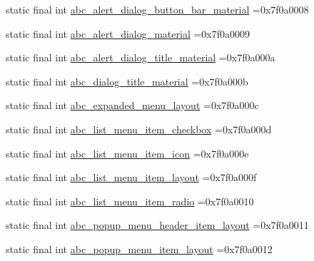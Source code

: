 \begin{DoxyCompactItemize}
\item 
static final int \mbox{\hyperlink{classcom_1_1example_1_1trainawearapplication_1_1_r_1_1layout_ae1856279bb4482399f68fefca5378a42}{abc\+\_\+alert\+\_\+dialog\+\_\+button\+\_\+bar\+\_\+material}} =0x7f0a0008
\item 
static final int \mbox{\hyperlink{classcom_1_1example_1_1trainawearapplication_1_1_r_1_1layout_a47723015bde9572767438130715175b2}{abc\+\_\+alert\+\_\+dialog\+\_\+material}} =0x7f0a0009
\item 
static final int \mbox{\hyperlink{classcom_1_1example_1_1trainawearapplication_1_1_r_1_1layout_af1fab65fcbc830701a52d074b94ac1ea}{abc\+\_\+alert\+\_\+dialog\+\_\+title\+\_\+material}} =0x7f0a000a
\item 
static final int \mbox{\hyperlink{classcom_1_1example_1_1trainawearapplication_1_1_r_1_1layout_abd04987178f7ae1df19fe80a7e9d4009}{abc\+\_\+dialog\+\_\+title\+\_\+material}} =0x7f0a000b
\item 
static final int \mbox{\hyperlink{classcom_1_1example_1_1trainawearapplication_1_1_r_1_1layout_ab11bee132c98e18e636d5cbecb73bf9f}{abc\+\_\+expanded\+\_\+menu\+\_\+layout}} =0x7f0a000c
\item 
static final int \mbox{\hyperlink{classcom_1_1example_1_1trainawearapplication_1_1_r_1_1layout_a5a3576985319319207ea0ee56b5b4ef5}{abc\+\_\+list\+\_\+menu\+\_\+item\+\_\+checkbox}} =0x7f0a000d
\item 
static final int \mbox{\hyperlink{classcom_1_1example_1_1trainawearapplication_1_1_r_1_1layout_a99f76f7af4d42db3fa1d171389098c96}{abc\+\_\+list\+\_\+menu\+\_\+item\+\_\+icon}} =0x7f0a000e
\item 
static final int \mbox{\hyperlink{classcom_1_1example_1_1trainawearapplication_1_1_r_1_1layout_a30db08ed250f785b2359ec797b0374d6}{abc\+\_\+list\+\_\+menu\+\_\+item\+\_\+layout}} =0x7f0a000f
\item 
static final int \mbox{\hyperlink{classcom_1_1example_1_1trainawearapplication_1_1_r_1_1layout_ae35b85c63a3a08515c45d69ba4f6d9c9}{abc\+\_\+list\+\_\+menu\+\_\+item\+\_\+radio}} =0x7f0a0010
\item 
static final int \mbox{\hyperlink{classcom_1_1example_1_1trainawearapplication_1_1_r_1_1layout_aa8066a5def4140547f537f499a4c4553}{abc\+\_\+popup\+\_\+menu\+\_\+header\+\_\+item\+\_\+layout}} =0x7f0a0011
\item 
static final int \mbox{\hyperlink{classcom_1_1example_1_1trainawearapplication_1_1_r_1_1layout_acea9a1080051d59006af1052a0929594}{abc\+\_\+popup\+\_\+menu\+\_\+item\+\_\+layout}} =0x7f0a0012

\end{DoxyCompactItemize}
